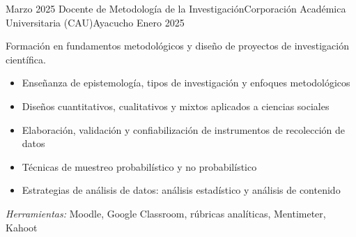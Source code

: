 \experience
{Marzo 2025} {Docente de Metodología de la Investigación}{Corporación Académica Universitaria (CAU)}{Ayacucho}
{Enero 2025} {
	Formación en fundamentos metodológicos y diseño de proyectos de investigación científica.
	\begin{itemize}
		\item Enseñanza de epistemología, tipos de investigación y enfoques metodológicos
		\item Diseños cuantitativos, cualitativos y mixtos aplicados a ciencias sociales
		\item Elaboración, validación y confiabilización de instrumentos de recolección de datos
		\item Técnicas de muestreo probabilístico y no probabilístico
		\item Estrategias de análisis de datos: análisis estadístico y análisis de contenido
	\end{itemize}
}
{\footnotesize{\emph{Herramientas:} Moodle, Google Classroom, rúbricas analíticas, Mentimeter, Kahoot}}
